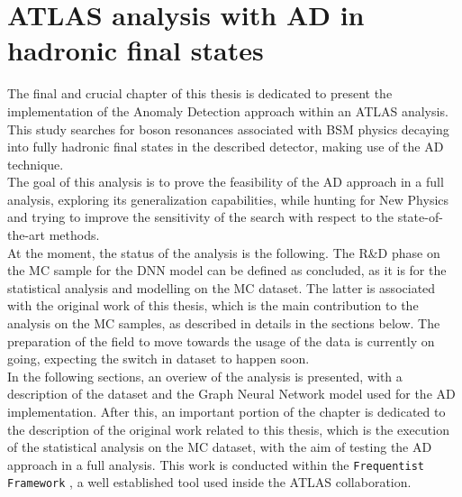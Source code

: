 \chapter{ATLAS analysis with AD in hadronic final states}\label{chap:ADJJ}

The final and crucial chapter of this thesis is dedicated to present the implementation of the Anomaly Detection approach within an ATLAS analysis.
This study searches for boson resonances associated with BSM physics decaying into fully hadronic final states in the described detector, making use of the AD technique.\\
The goal of this analysis is to prove the feasibility of the AD approach in a full analysis, exploring its generalization capabilities, while hunting for New Physics and trying to improve the sensitivity of the search with respect to the state-of-the-art methods.\\ 
At the moment, the status of the analysis is the following.
The R\&D phase on the MC sample for the DNN model can be defined as concluded, as it is for the statistical analysis and modelling on the MC dataset.
The latter is associated with the original work of this thesis, which is the main contribution to the analysis on the MC samples, as described in details in the sections below.
The preparation of the field to move towards the usage of the data is currently on going, expecting the switch in dataset to happen soon.\\
In the following sections, an overiew of the analysis is presented, with a description of the dataset and the Graph Neural Network model used for the AD implementation. 
After this, an important portion of the chapter is dedicated to the description of the original work related to this thesis, which is the execution of the statistical analysis on the MC dataset, with the aim of testing the AD approach in a full analysis.
This work is conducted within the \texttt{Frequentist Framework} \cite{FF}, a well established tool used inside the ATLAS collaboration. 

